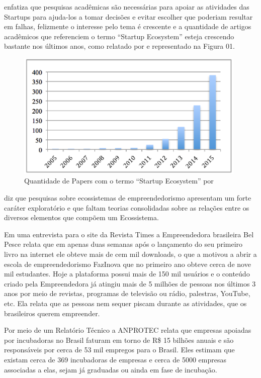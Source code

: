  enfatiza que pesquisas acadêmicas são necessárias para apoiar as atividades das Startups para ajuda-los a tomar decisões e evitar escolher que poderiam resultar em falhas, felizmente o interesse pelo tema é crescente e a quantidade de artigos acadêmicos que referenciem o termo ``Startup Ecosystem'' esteja crescendo bastante nos últimos anos, como relatado por  e representado na Figura 01.

\begin{figure}[!htb]
\centering
\includegraphics[width=11cm,angle=0]{figuras/papers_about_startup_ecosystems}
\caption{Quantidade de Papers com o termo ``Startup Ecosystem'' por }
\label{figure:papers_about_startup_ecosystems}
\end{figure}

 diz que pesquisas sobre ecossistemas de empreendedorismo apresentam um forte caráter exploratório e que faltam teorias consolidadas sobre as relações entre os diversos elementos que compõem um Ecossistema. 

Em uma entrevista para o site da Revista Times a Empreendedora brasileira Bel Pesce relata que em apenas duas semanas após o lançamento do seu primeiro livro na internet ele obteve mais de cem mil downloads, o que a motivou a abrir a escola de empreendedorismo FazInova que no primeiro ano obteve cerca de nove mil estudantes. Hoje a plataforma possui mais de 150 mil usuários e o conteúdo criado pela Empreendedora já atingiu mais de 5 milhões de pessoas nos últimos 3 anos por meio de revistas, programas de televisão ou rádio, palestras, YouTube, etc. Ela relata que as pessoas nem sequer piscam durante as atividades, que os brasileiros querem empreender.

Por meio de um Relatório Técnico a ANPROTEC relata que empresas apoiadas por incubadoras no Brasil faturam em torno de R\$ 15 bilhões anuais e são responsáveis por cerca de 53 mil empregos para o Brasil. Eles estimam que existam cerca de 369 incubadoras de empresas e cerca de 5000 empresas associadas a elas, sejam já graduadas ou ainda em fase de incubação. 

